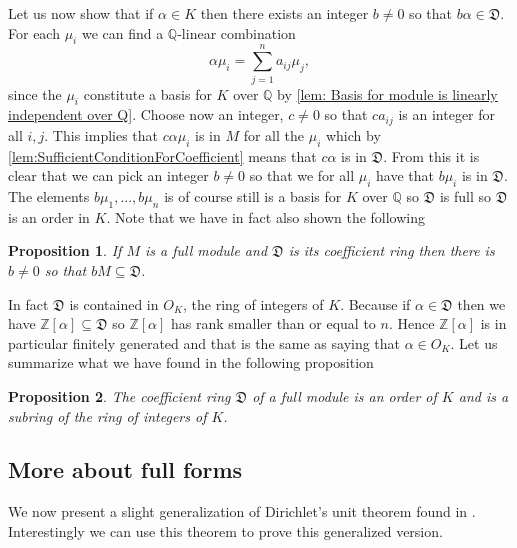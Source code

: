 \documentclass{article}
\newtheorem{proposition}{Proposition}[section]
\newcommand{\mfrak}[1]{\mathfrak{#1}}
\newcommand{\mcal}[1]{\mathcal{#1}}
\newcommand{\mbb}[1]{\mathbb{#1}}
\numberwithin{equation}{section}
\begin{document}
Let us now show that if $\alpha \in K$ then there exists an integer $b \neq 0$ so that $b \alpha \in \mfrak D$. For each $\mu_i$ we can find a $\mbb Q$-linear combination
$$\alpha \mu_i = \sum_{j=1}^n a_{ij} \mu_j,$$
since the $\mu_i$ constitute a basis for $K$ over $\mbb Q$ by \cref{lem: Basis for module is linearly independent over Q}. Choose now an integer, $c \neq 0$ so that $c a_{ij}$ is an integer for all $i,j$. This implies that $c \alpha \mu_i$ is in $M$ for all the $\mu_i$ which by \cref{lem:SufficientConditionForCoefficient} means that $c \alpha$ is in $\mfrak D$. From this it is clear that we can pick an integer $b \neq 0$ so that we for all $\mu_i$ have that $b \mu_i$ is in $\mfrak D$. The elements $b \mu_1, ..., b\mu_n$ is of course still is a basis for $K$ over $\mbb Q$ so $\mfrak D$ is full so $\mfrak D$ is an order in $K$. Note that we have in fact also shown the following
\begin{proposition}\label{bM contained in D}
    If $M$ is a full module and $\mfrak D$ is its coefficient ring then there is $b \neq 0$ so that $bM \subseteq \mfrak D$.
\end{proposition}
In fact $\mfrak D$ is contained in $O_K$, the ring of integers of $K$. Because if $\alpha \in \mfrak D$ then we have $\mbb Z[\alpha] \subseteq \mfrak D$ so $\mbb Z[\alpha]$ has rank smaller than or equal to $n$. Hence $\mbb Z[\alpha]$ is in particular finitely generated and that is the same as saying that $\alpha \in O_K$. Let us summarize what we have found in the following proposition
\begin{proposition}\label{prop: Coefficient ring properties}
    The coefficient ring $\mfrak D$ of a full module is an order of $K$ and is a subring of the ring of integers of $K$.
\end{proposition}

\subsection{More about full forms}
We now present a slight generalization of Dirichlet's unit theorem found in \citep[Theorem 38]{marcus}. Interestingly we can use this theorem to prove this generalized version.
\end{document}
